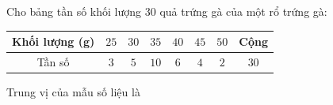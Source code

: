 \begin{ex}
Cho bảng tần số khối lượng $30$ quả trứng gà của một rổ trứng gà:
\begin{center}
\begin{tabular}{|c|c|c|c|c|c|c|c|}\hline
Khối lượng (g) & $25$ & $30$ & $35$ & $40$ & $45$ & $50$ & Cộng\\\hline
Tần số & $3$ & $5$ & $10$ & $6$ & $4$ & $2$ & $30$\\\hline
\end{tabular}
\end{center}
Trung vị của mẫu số liệu là
\end{ex}

